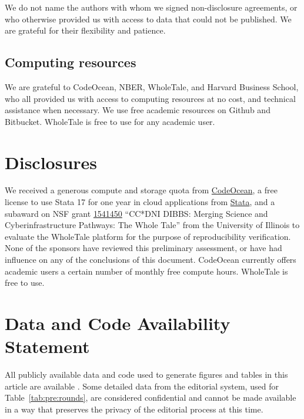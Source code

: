 We do not name the authors with whom we signed non-disclosure agreements, or who otherwise provided us with access to data that could not be published. We are grateful for their flexibility and patience.

\subsection{Computing resources}
\label{app:3rdparty-computing}

We are grateful to CodeOcean, NBER, WholeTale, and Harvard Business School, who all provided us with access to computing resources at no cost, and technical assistance when necessary. We use free academic resources on Github and Bitbucket. WholeTale is free to use for any academic user.


\section{Disclosures}
\label{sec:disclosure}

We received a generous compute and storage quota from \href{https://codeocean.com/}{CodeOcean}, a free license to use Stata 17 for one year in cloud applications from \href{https://stata.com/}{Stata}, and a subaward on NSF grant \href{https://nsf.gov/awardsearch/showAward?AWD_ID=1541450&HistoricalAwards=false}{1541450} ``CC*DNI DIBBS: Merging Science and Cyberinfrastructure Pathways: The Whole Tale'' from the University of Illinois to evaluate the WholeTale platform for the purpose of reproducibility verification. None of the sponsors have reviewed this preliminary assessment, or have had influence on any of the conclusions of this document. CodeOcean currently offers academic users a certain number of monthly free compute hours. WholeTale is free to use.


\section{Data and Code Availability Statement}
\label{sec:dcas}

All publicly available data and code used to generate figures and tables in this article are available \citep{report2022data,E117876V4}. Some detailed data from the editorial system, used for Table~\ref{tab:pre:rounds}, are considered confidential and cannot be made available in a way that preserves the privacy of the editorial process at this time.
